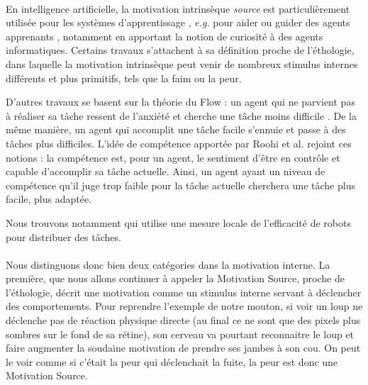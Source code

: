         
        \paragraph{}
        En intelligence artificielle, la motivation intrinsèque \textit{source} est particulièrement utilisée pour les systèmes d'apprentissage \cite{schmidhuber_formal_2010}, \textit{e.g.} pour aider ou guider des agents apprenants \cite{baldassarre_intrinsically_2013}, notamment en apportant la notion de curiosité à des agents informatiques. Certains travaux  \cite{carbonell_multi-agent_1994, maes_agent_1991} s'attachent à sa définition proche de l'éthologie, dans laquelle la motivation intrinsèque peut venir de nombreux stimulus internes différents et plus primitifs, tels que la faim ou la peur.
        
        D'autres travaux se basent sur la théorie du Flow : un agent qui ne parvient pas à réaliser sa tâche ressent de l'anxiété et cherche une tâche moins difficile \cite{cornudella_how_2015}. De la même manière, un agent qui accomplit une tâche facile s'ennuie et passe à des tâches plus difficiles. L'idée de compétence apportée par Roohi et al.\cite{roohi_review_2018} rejoint ces notions : la compétence est, pour un agent, le sentiment d'être en contrôle et capable d'accomplir sa tâche actuelle. Ainsi, un agent ayant un niveau de compétence qu'il juge trop faible pour la tâche actuelle cherchera une tâche plus facile, plus adaptée.
        
        Nous trouvons notamment \cite{agassounon_scalable_2001} qui utilise une mesure locale de l'efficacité de robots pour distribuer des tâches.
        
        \paragraph{}
        Nous distinguons donc bien deux catégories dans la motivation interne. La première, que nous allons continuer à appeler la Motivation Source, proche de l'éthologie, décrit une motivation comme un stimulus interne servant à déclencher des comportements. Pour reprendre l'exemple de notre mouton, si voir un loup ne déclenche pas de réaction physique directe (au final ce ne sont que des pixels plus sombres sur le fond de sa rétine), son cerveau va pourtant reconnaitre le loup et faire augmenter la soudaine motivation de prendre ses jambes à son cou. On peut le voir comme si c'était la peur qui déclenchait la fuite, la peur est donc une Motivation Source.
        
